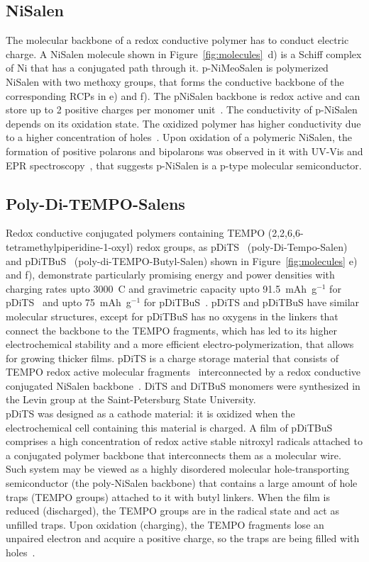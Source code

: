 \subsection{NiSalen}
The molecular backbone of a redox conductive polymer has to conduct electric charge. A NiSalen molecule shown in Figure~\ref{fig:molecules}~d) is a Schiff complex of Ni that has a conjugated path through it. p-NiMeoSalen is polymerized NiSalen with two methoxy groups, that forms the conductive backbone of the corresponding RCPs in e) and f). The pNiSalen backbone is redox active and can store up to 2 positive charges per monomer unit~\cite{Dmitrieva2018}. The conductivity of p-NiSalen depends on its oxidation state. The oxidized polymer has higher conductivity due to a higher concentration of holes~\cite{Dmitrieva2018}. Upon oxidation of a polymeric NiSalen, the formation of positive polarons and bipolarons was observed in it with UV-Vis and EPR spectroscopy~\cite{Dmitrieva2018}, that suggests p-NiSalen is a p-type molecular semiconductor.


\subsection{Poly-Di-TEMPO-Salens}
Redox conductive conjugated polymers containing TEMPO (2,2,6,6-tetramethylpiperidine-1-oxyl) redox groups, as pDiTS~\cite{Vereshchagin2020,Kulikov2022} (poly-Di-Tempo-Salen) and pDiTBuS~\cite{Kulikov2023} (poly-di-TEMPO-Butyl-Salen) shown in Figure~\ref{fig:molecules} e) and f), demonstrate particularly promising energy and power densities with charging rates upto 3000~C and gravimetric capacity upto 91.5~mAh~g$^{-1}$ for pDiTS~\cite{Vereshchagin2020} and upto 75~mAh~g$^{-1}$ for pDiTBuS~\cite{Kulikov2023}. pDiTS and pDiTBuS have similar molecular structures, except for pDiTBuS has no oxygens in the linkers that connect the backbone to the TEMPO fragments, which has led to its higher electrochemical stability and a more efficient electro-polymerization, that allows for growing thicker films. pDiTS is a charge storage material that consists of TEMPO redox active molecular fragments~\cite{Vereshchagin2022,jeschke2012_annrevphyschem,Halbmair2016} interconnected by a redox conductive conjugated NiSalen backbone~\cite{Vereshchagin2020,Dmitrieva2018}. DiTS and DiTBuS monomers were synthesized in the Levin group at the Saint-Petersburg State University.\\
pDiTS was designed as a cathode material: it is oxidized when the electrochemical cell containing this material is charged. A film of pDiTBuS comprises a high concentration of redox active stable nitroxyl radicals attached to a conjugated polymer backbone that interconnects them as a molecular wire. Such system may be viewed as a highly disordered molecular hole-transporting semiconductor (the poly-NiSalen backbone) that contains a large amount of hole traps (TEMPO groups) attached to it with butyl linkers. When the film is reduced (discharged), the TEMPO groups are in the radical state and act as unfilled traps. Upon oxidation (charging), the TEMPO fragments lose an unpaired electron and acquire a positive charge, so the traps are being filled with holes~\cite{Kulikov2023}.

